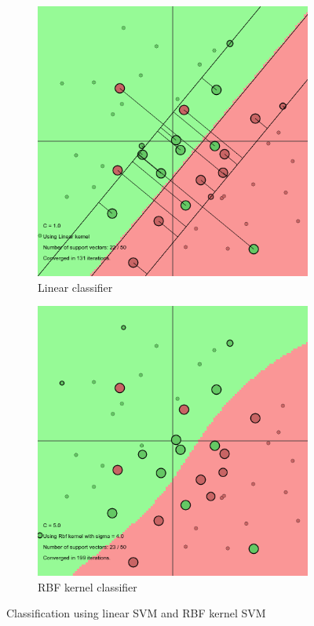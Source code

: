 \documentclass[11pt, a4paper]{article}
\begin{document}
\begin{figure}[H]
    \centering
    \begin{subfigure}{.5\textwidth}
      \centering
      \includegraphics[width=0.9\linewidth]{1-2-1-kernel6n2.png}
      \caption{Linear classifier}
      \label{fig:rbf_linclass}
    \end{subfigure}%
    \begin{subfigure}{.5\textwidth}
      \centering
      \includegraphics[width=0.9\linewidth]{1-2-1-kernel6n.png}
      \caption{RBF kernel classifier}
      \label{fig:rbf_class}
    \end{subfigure}
    \caption{Classification using linear SVM and RBF kernel SVM}
    \label{fig:rbf_lin_data}
\end{figure}
\end{document}
